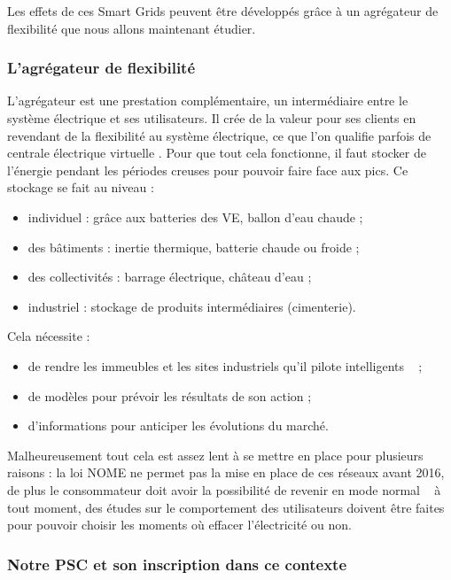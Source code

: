 \documentclass[10pt]{article}
\begin{document}
			Les effets de ces Smart Grids peuvent être développés grâce à un agrégateur de flexibilité que nous allons maintenant étudier.
		
		
		\subsubsection{L'agrégateur de flexibilité}
		
			L’agrégateur est une prestation complémentaire, un intermédiaire entre le système électrique et ses utilisateurs. Il crée de la valeur pour ses clients en revendant de la flexibilité au système électrique, ce que l'on qualifie parfois de \og centrale électrique virtuelle \fg. Pour que tout cela fonctionne, il faut stocker de l’énergie pendant les périodes creuses pour pouvoir faire face aux pics. Ce stockage se fait au niveau :
			
			\begin{itemize}
				\item individuel : grâce aux batteries des VE, ballon d'eau chaude ;
				\item des bâtiments : inertie thermique, batterie chaude ou froide ;
				\item des collectivités : barrage électrique, château d'eau ;
				\item industriel : stockage de produits intermédiaires (cimenterie).
			\end{itemize}
			
			Cela nécessite :
	
			\begin{itemize}
				\item de rendre les immeubles et  les sites industriels qu'il pilote \og intelligents \fg~ ;
				\item de modèles pour prévoir les résultats de son action ;
				\item d'informations pour anticiper les évolutions du marché.
			\end{itemize}
			
			Malheureusement tout cela est assez lent à se mettre en place pour plusieurs raisons : la loi NOME ne permet pas la mise en place de ces réseaux avant 2016, de plus le consommateur doit avoir la possibilité de revenir en mode \og normal \fg~ à tout moment, des études sur le comportement des utilisateurs doivent être faites pour pouvoir choisir les moments où effacer l’électricité ou non.
	
		\subsubsection{Notre PSC et son inscription dans ce contexte}
		
\end{document}
